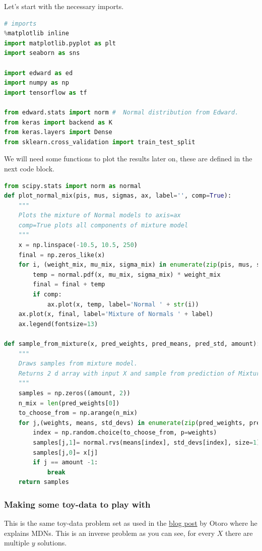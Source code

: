 Let's start with the necessary imports.

\begin{lstlisting}[language=Python]
# imports
%matplotlib inline
import matplotlib.pyplot as plt
import seaborn as sns

import edward as ed
import numpy as np
import tensorflow as tf

from edward.stats import norm #  Normal distribution from Edward.
from keras import backend as K
from keras.layers import Dense
from sklearn.cross_validation import train_test_split
\end{lstlisting}

We will need some functions to plot the results later on, these are defined in the next code block.

\begin{lstlisting}[language=Python]
from scipy.stats import norm as normal
def plot_normal_mix(pis, mus, sigmas, ax, label='', comp=True):
    """
    Plots the mixture of Normal models to axis=ax
    comp=True plots all components of mixture model
    """
    x = np.linspace(-10.5, 10.5, 250)
    final = np.zeros_like(x)
    for i, (weight_mix, mu_mix, sigma_mix) in enumerate(zip(pis, mus, sigmas)):
        temp = normal.pdf(x, mu_mix, sigma_mix) * weight_mix
        final = final + temp
        if comp:
            ax.plot(x, temp, label='Normal ' + str(i))
    ax.plot(x, final, label='Mixture of Normals ' + label)
    ax.legend(fontsize=13)

def sample_from_mixture(x, pred_weights, pred_means, pred_std, amount):
    """
    Draws samples from mixture model.
    Returns 2 d array with input X and sample from prediction of Mixture Model
    """
    samples = np.zeros((amount, 2))
    n_mix = len(pred_weights[0])
    to_choose_from = np.arange(n_mix)
    for j,(weights, means, std_devs) in enumerate(zip(pred_weights, pred_means, pred_std)):
        index = np.random.choice(to_choose_from, p=weights)
        samples[j,1]= normal.rvs(means[index], std_devs[index], size=1)
        samples[j,0]= x[j]
        if j == amount -1:
            break
    return samples
\end{lstlisting}

\subsubsection{Making some toy-data to play with}

This is the same toy-data problem set as used in the \href{http://blog.otoro.net/2015/11/24/mixture-density-networks-with-tensorflow/}{blog post} by Otoro where he explains MDNs. This is an inverse problem as you can see, for every $X$ there are multiple $y$ solutions.

